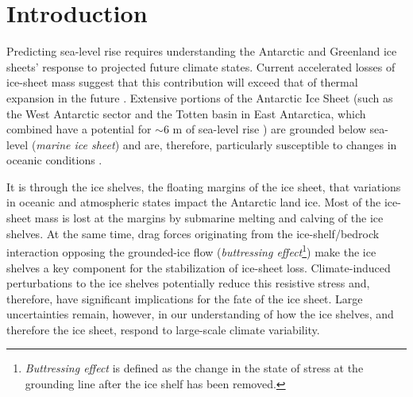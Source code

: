 \section{Introduction}

\noindent
Predicting sea-level rise requires understanding the Antarctic and Greenland ice sheets' response to projected future climate states. Current accelerated losses of ice-sheet mass suggest that this contribution will exceed that of thermal expansion in the future \parencite{Shepherd2012, Harig2015, Velicogna2009, Sutterley2014}. Extensive portions of the Antarctic Ice Sheet (such as the West Antarctic sector and the Totten basin in East Antarctica, which combined have a potential for $\sim$6 m of sea-level rise \parencite{Fretwell2013}) are grounded below sea-level ({\it marine ice sheet}) and are, therefore, particularly susceptible to changes in oceanic conditions \parencite[e.g.,][]{Joughin2012}.

It is through the ice shelves, the floating margins of the ice sheet, that variations in oceanic and atmospheric states impact the Antarctic land ice. Most of the ice-sheet mass is lost at the margins by submarine melting and calving of the ice shelves. At the same time, drag forces originating from the ice-shelf/bedrock interaction opposing the grounded-ice flow (\emph{buttressing effect}\footnote{\emph{Buttressing effect} is defined as the change in the state of stress at the grounding line after the ice shelf has been removed.}) make the ice shelves a key component for the stabilization of ice-sheet loss. Climate-induced perturbations to the ice shelves potentially reduce this resistive stress and, therefore, have significant implications for the fate of the ice sheet. Large uncertainties remain, however, in our understanding of how the ice shelves, and therefore the ice sheet, respond to large-scale climate variability.

